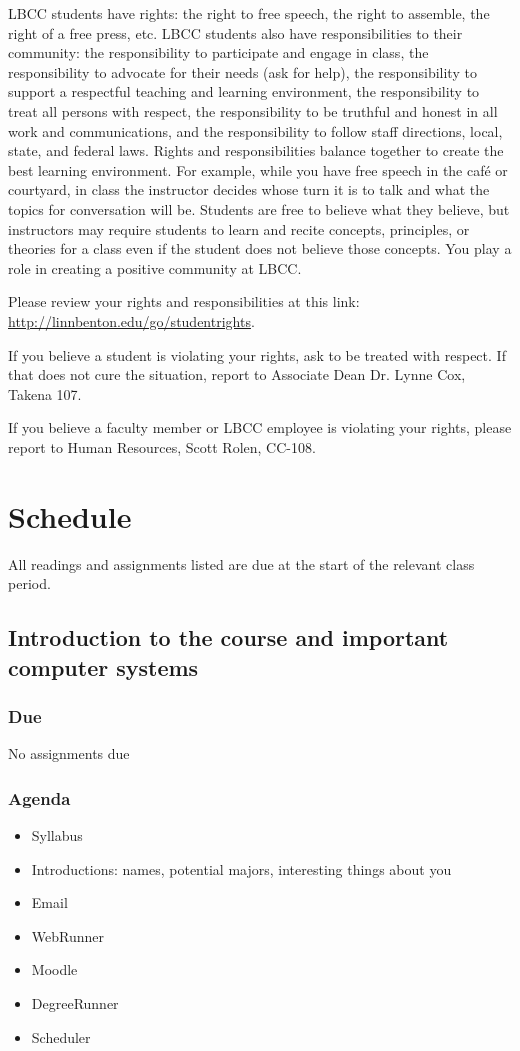 \documentclass[12pt,article,oneside]{memoir}
\begin{document}
LBCC students have rights: the right to free speech, the right to assemble, the right of a free press, etc. LBCC students also have responsibilities to their community: the responsibility to participate and engage in class, the responsibility to advocate for their needs (ask for help), the responsibility to support a respectful teaching and learning environment, the responsibility to treat all persons with respect, the responsibility to be truthful and honest in all work and communications, and the responsibility to follow staff directions, local, state, and federal laws. Rights and responsibilities balance together to create the best learning environment. For example, while you have free speech in the café or courtyard, in class the instructor decides whose turn it is to talk and what the topics for conversation will be. Students are free to believe what they believe, but instructors may require students to learn and recite concepts, principles, or theories for a class even if the student does not believe those concepts. You play a role in creating a positive community at LBCC. 

Please review your rights and responsibilities at this link: \url{http://linnbenton.edu/go/studentrights}.

If you believe a student is violating your rights, ask to be treated with respect. If that does not cure the situation, report to Associate Dean Dr. Lynne Cox, Takena 107.

If you believe a faculty member or LBCC employee is violating your rights, please report to Human Resources, Scott Rolen, CC-108.

\section{Schedule}

All readings and assignments listed are due at the start of the relevant class period.

\subsection{Introduction to the course and important computer systems}

\subsubsection{Due}
No assignments due

\subsubsection{Agenda}
\begin{itemize}
 \item Syllabus
 \item Introductions: names, potential majors, interesting things about you
 \item Email
 \item WebRunner
 \item Moodle
 \item DegreeRunner
 \item Scheduler
\end{itemize}
\end{document}
